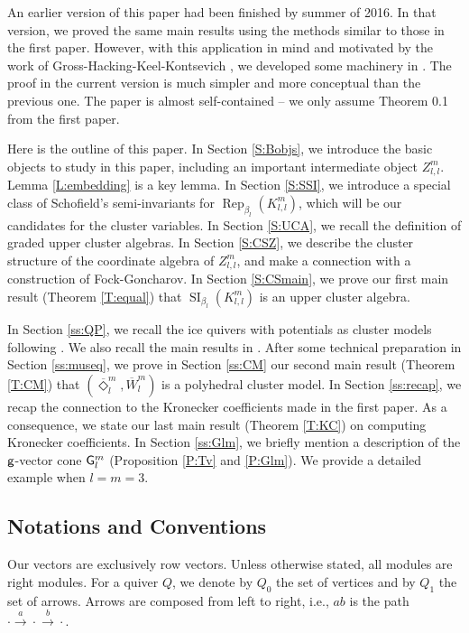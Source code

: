 \documentclass{amsart}
\theoremstyle{definition}
\theoremstyle{remark}
\numberwithin{equation}{section}
\DeclareMathOperator{\Rep}{Rep}
\DeclareMathOperator{\SI}{SI}
\newcommand{\mr}[1]{{\sf #1}}%
\newcommand{\br}[1]{\overline{#1}}
\newcommand{\g}{{\sf g}}
\newcommand{\kllm}{{K_{l,l}^m}}
\newcommand{\zllm}{{Z_{l,l}^m}}
\newcommand{\bl}{{\beta_l}}
\begin{document}
An earlier version of this paper had been finished by summer of 2016. In that version, we proved the same main results using the methods similar to those in the first paper. However, with this application in mind and motivated by the work of Gross-Hacking-Keel-Kontsevich \cite{GHKK}, we developed some machinery in \cite{FW}. The proof in the current version is much simpler and more conceptual than the previous one.  
The paper is almost self-contained -- we only assume Theorem 0.1 from the first paper.


Here is the outline of this paper.
In Section \ref{S:Bobjs}, we introduce the basic objects to study in this paper, including an important intermediate object $\zllm$.
Lemma \ref{L:embedding} is a key lemma.
In Section \ref{S:SSI}, we introduce a special class of Schofield's semi-invariants for $\Rep_{\bl}(\kllm)$, which will be our candidates for the cluster variables.
In Section \ref{S:UCA}, we recall the definition of graded upper cluster algebras.
In Section \ref{S:CSZ}, we describe the cluster structure of the coordinate algebra of $\zllm$, and make a connection with a construction of Fock-Goncharov.
In Section \ref{S:CSmain}, we prove our first main result (Theorem \ref{T:equal}) that $\SI_\bl(\kllm)$ is an upper cluster algebra.


In Section \ref{ss:QP}, we recall the ice quivers with potentials as cluster models following \cite{DWZ1,P,Fs1}. 
We also recall the main results in \cite{FW}. After some technical preparation in Section \ref{ss:museq},
we prove in Section \ref{ss:CM} our second main result (Theorem \ref{T:CM}) that $(\br{\Diamond}_l^m,\br{W}_l^m)$ is a polyhedral cluster model.
In Section \ref{ss:recap}, we recap the connection to the Kronecker coefficients made in the first paper.
As a consequence, we state our last main result (Theorem \ref{T:KC}) on computing Kronecker coefficients.  
In Section \ref{ss:Glm}, we briefly mention a description of the $\g$-vector cone $\mr{G}_l^m$ (Proposition \ref{P:Tv} and \ref{P:Glm}). 
We provide a detailed example when $l=m=3$. 
 

\subsection*{Notations and Conventions}
Our vectors are exclusively row vectors. Unless otherwise stated, all modules are right modules.
For a quiver $Q$, we denote by $Q_0$ the set of vertices and by $Q_1$ the set of arrows.
Arrows are composed from left to right, i.e., $ab$ is the path $\cdot \xrightarrow{a}\cdot \xrightarrow{b} \cdot$.
\end{document}
